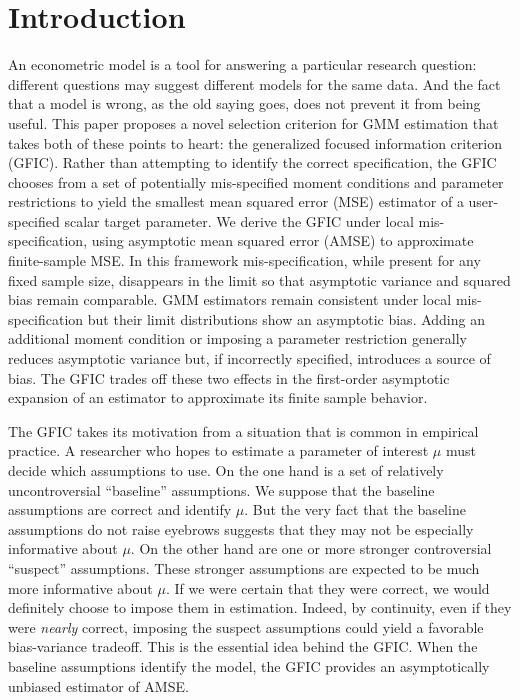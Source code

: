 \section{Introduction}

An econometric model is a tool for answering a particular research question: different questions may suggest different models for the same data. 
And the fact that a model is wrong, as the old saying goes, does not prevent it from being useful. 
This paper proposes a novel selection criterion for GMM estimation that takes both of these points to heart: the generalized focused information criterion (GFIC). 
Rather than attempting to identify the correct specification, the GFIC chooses from a set of potentially mis-specified moment conditions and parameter restrictions to yield the smallest mean squared error (MSE) estimator of a user-specified scalar target parameter. 
We derive the GFIC under local mis-specification, using asymptotic mean squared error (AMSE) to approximate finite-sample MSE. 
In this framework mis-specification, while present for any fixed sample size, disappears in the limit so that asymptotic variance and squared bias remain comparable. 
GMM estimators remain consistent under local mis-specification but their limit distributions show an asymptotic bias. 
Adding an additional moment condition or imposing a parameter restriction generally reduces asymptotic variance but, if incorrectly specified, introduces a source of bias.
The GFIC trades off these two effects in the first-order asymptotic expansion of an estimator to approximate its finite sample behavior.

The GFIC takes its motivation from a situation that is common in empirical practice.
A researcher who hopes to estimate a parameter of interest $\mu$ must decide which assumptions to use.
On the one hand is a set of relatively uncontroversial ``baseline'' assumptions.
We suppose that the baseline assumptions are correct and identify $\mu$.
But the very fact that the baseline assumptions do not raise eyebrows suggests that they may not be especially informative about $\mu$. 
On the other hand are one or more stronger controversial ``suspect'' assumptions.
These stronger assumptions are expected to be much more informative about $\mu$.
If we were certain that they were correct, we would definitely choose to impose them in estimation.
Indeed, by continuity, even if they were \emph{nearly} correct, imposing the suspect assumptions could yield a favorable bias-variance tradeoff.
This is the essential idea behind the GFIC.
When the baseline assumptions identify the model, the GFIC provides an asymptotically unbiased estimator of AMSE.

